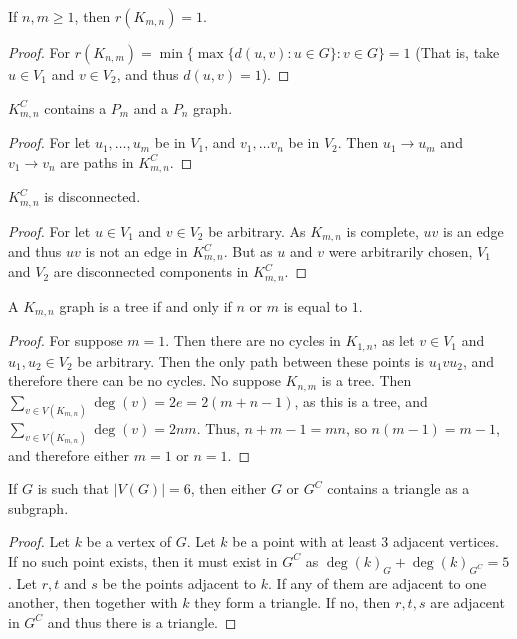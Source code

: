 \documentclass[crop=false,class=book]{standalone}
\begin{document}
\begin{corollary}
If $n,m\geq 1$, then $r(K_{m,n}) = 1$.
\end{corollary}
\begin{proof}
For $r(K_{n,m}) = \min\{ \max\{d(u,v):u\in G\}: v\in G\} = 1$ (That is, take $u\in V_1$ and $v\in V_2$, and thus $d(u,v)=1$).
\end{proof}
\begin{corollary}
$K_{m,n}^C$ contains a $P_m$ and a $P_n$ graph.
\end{corollary}
\begin{proof}
For let $u_1,\hdots, u_m$ be in $V_1$, and $v_1,\hdots v_n$ be in $V_2$. Then $u_1 \rightarrow u_m$ and $v_1 \rightarrow v_n$ are paths in $K_{m,n}^C$.
\end{proof}
\begin{theorem}
$K_{m,n}^C$ is disconnected.
\end{theorem}
\begin{proof}
For let $u\in V_1$ and $v\in V_2$ be arbitrary. As $K_{m,n}$ is complete, $uv$ is an edge and thus $uv$ is not an edge in $K_{m,n}^C$. But as $u$ and $v$ were arbitrarily chosen, $V_1$ and $V_2$ are disconnected components in $K_{m,n}^C$.
\end{proof}
\begin{theorem}
A $K_{m,n}$ graph is a tree if and only if $n$ or $m$ is equal to $1$.
\end{theorem}
\begin{proof}
For suppose $m=1$. Then there are no cycles in $K_{1,n}$, as let $v\in V_1$ and $u_1,u_2\in V_2$ be arbitrary. Then the only path between these points is $u_1 v u_2$, and therefore there can be no cycles. No suppose $K_{n,m}$ is a tree. Then $\sum_{v\in V(K_{m,n})}\deg(v) = 2e=2(m+n-1)$, as this is a tree, and $\sum_{v\in V(K_{m,n})}\deg(v) = 2nm$. Thus, $n+m-1=mn$, so $n(m-1)=m-1$, and therefore either $m=1$ or $n=1$.
\end{proof}
\begin{theorem}
If $G$ is such that $|V(G)|=6$, then either $G$ or $G^C$ contains a triangle as a subgraph.
\end{theorem}
\begin{proof}
Let $k$ be a vertex of $G$. Let $k$ be a point with at least $3$ adjacent vertices. If no such point exists, then it must exist in $G^C$ as $\deg(k)_G+\deg(k)_{G^C}=5$. Let $r,t$ and $s$ be the points adjacent to $k$. If any of them are adjacent to one another, then together with $k$ they form a triangle. If no, then $r,t,s$ are adjacent in $G^C$ and thus there is a triangle.
\end{proof}
\end{document}
